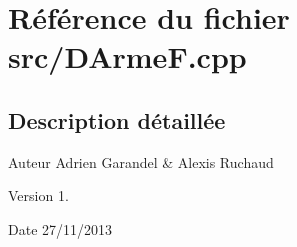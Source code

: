 \section{Référence du fichier src/\-D\-Arme\-F.cpp}
\label{_d_arme_f_8cpp}


\subsection{Description détaillée}
\begin{DoxyAuthor}{Auteur}
Adrien Garandel \& Alexis Ruchaud 
\end{DoxyAuthor}
\begin{DoxyVersion}{Version}
1. 
\end{DoxyVersion}
\begin{DoxyDate}{Date}
27/11/2013 
\end{DoxyDate}

